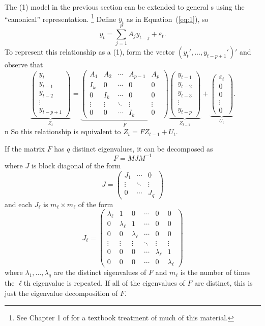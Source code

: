 \documentclass[12pt,fleqn]{article}
\newcommand{\vep}{\varepsilon}
\newcommand{\AR}{\allcaps{AR}}
\begin{document}
The \AR(1) model in the previous section can be extended to general
\VAR s using the ``canonical'' representation.%
\footnote{See Chapter 1 of \citet{Ham:94} for a textbook treatment of
  much of this material.} %
Define $y_t$ as in Equation~(\ref{eq:1}), so
\[
y_t = \sum_{j=1}^p A_j y_{t-j} + \vep_t.
\]
To represent this relationship as a \VAR(1), form the vector
$(y_t',\dots,y_{t-p+1}')'$ and observe that
\[
\underbrace{\begin{pmatrix}
  y_t \\ y_{t-1} \\ y_{t-2} \\ \vdots \\ y_{t-p+1}
\end{pmatrix}}_{Z_t}
=
\underbrace{\begin{pmatrix}
  A_1 & A_2 & \cdots & A_{p-1} & A_p \\
  I_k & 0   & \cdots & 0 & 0 \\
  0  & I_k  & \cdots & 0 & 0 \\
  \vdots & \vdots & \ddots & \vdots & \vdots \\
  0 & 0 & \cdots & I_k & 0
\end{pmatrix}}_{F}
\underbrace{\begin{pmatrix}
  y_{t-1} \\ y_{t-2} \\ y_{t-3} \\ \vdots \\ y_{t-p}
\end{pmatrix}}_{Z_{t-1}}
+
\underbrace{\begin{pmatrix}
  \vep_{t} \\ 0 \\ 0 \\ \vdots \\ 0
\end{pmatrix}}_{U_t}.
\]n
So this relationship is equivalent to $Z_t = F Z_{t-1} + U_t$.

If the matrix $F$ has $q$ distinct
eigenvalues, it can be decomposed as
\[
F = M J M^{-1}
\]
where $J$ is block diagonal of the form
\[
J = \begin{pmatrix}
  J_1 & \cdots & 0 \\
  \vdots & \ddots & \vdots \\
  0 & \cdots & J_q
\end{pmatrix}
\]
and each $J_\ell$ is $m_\ell \times m_\ell$ of the form
\[
J_\ell =
\begin{pmatrix}
  \lambda_\ell & 1 & 0 & \cdots & 0 & 0 \\
  0 & \lambda_\ell & 1 & \cdots & 0 & 0 \\
  0 & 0 & \lambda_\ell & \cdots & 0 & 0 \\
  \vdots & \vdots & \vdots & \ddots & \vdots & \vdots \\
  0 & 0 & 0 & \cdots & \lambda_\ell & 1 \\
  0 & 0 & 0 & \cdots & 0 & \lambda_\ell
\end{pmatrix}
\]
where $\lambda_1,\dots,\lambda_q$ are the distinct eigenvalues of $F$
and $m_\ell$ is the number of times the $\ell$th eigenvalue is
repeated.  If all of the eigenvalues of $F$ are distinct, this is just
the eigenvalue decomposition of $F$.
\end{document}
